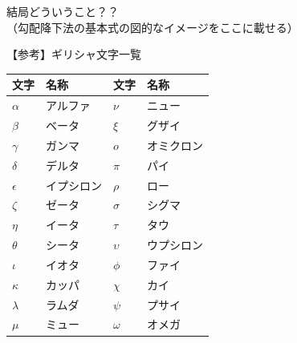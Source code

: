 \documentclass[dvipdfmx,aspectratio=169]{beamer}
\begin{document}
	\begin{frame}{結局どういうこと？？}
		（勾配降下法の基本式の図的なイメージをここに載せる）
	\end{frame}

	\begin{frame}{【参考】ギリシャ文字一覧}
		\begin{table}[]
			\begin{tabular}{ll|ll}
				\toprule
				文字         & 名称    & 文字         & 名称    \\
				\midrule
				$\alpha$   & アルファ  & $\nu$      & ニュー   \\
				$\beta$    & ベータ   & $\xi$      & グザイ   \\
				$\gamma$   & ガンマ   & $o$        & オミクロン \\
				$\delta$   & デルタ   & $\pi$      & パイ    \\
				$\epsilon$ & イプシロン & $\rho$     & ロー    \\
				$\zeta$    & ゼータ   & $\sigma$   & シグマ   \\
				$\eta$     & イータ   & $\tau$     & タウ    \\
				$\theta$   & シータ   & $\upsilon$ & ウプシロン \\
				$\iota$     & イオタ   & $\phi$     & ファイ   \\
				$\kappa$   & カッパ   & $\chi$     & カイ    \\
				$\lambda$  & ラムダ   & $\psi$     & プサイ   \\
				$\mu$      & ミュー   & $\omega$   & オメガ  \\
				\bottomrule
			\end{tabular}
		\end{table}
	\end{frame}
\end{document}
